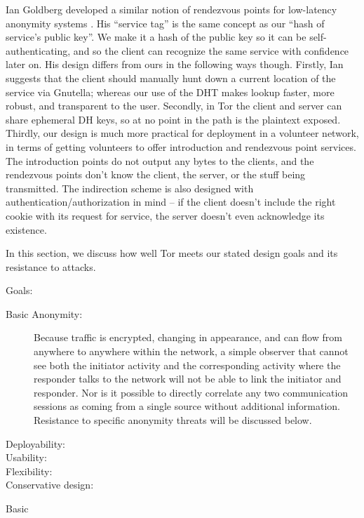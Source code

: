 \documentclass[times,10pt,twocolumn]{article}
\begin{document}
Ian Goldberg developed a similar notion of rendezvous points for
low-latency anonymity systems \cite{ian-thesis}. His ``service tag''
is the same concept as our ``hash of service's public key''. We make it
a hash of the public key so it can be self-authenticating, and so the
client can recognize the same service with confidence later on. His
design differs from ours in the following ways though. Firstly, Ian
suggests that the client should manually hunt down a current location of
the service via Gnutella; whereas our use of the DHT makes lookup faster,
more robust, and transparent to the user. Secondly, in Tor the client
and server can share ephemeral DH keys, so at no point in the path is
the plaintext
exposed. Thirdly, our design is much more practical for deployment in a
volunteer network, in terms of getting volunteers to offer introduction
and rendezvous point services. The introduction points do not output any
bytes to the clients, and the rendezvous points don't know the client,
the server, or the stuff being transmitted. The indirection scheme
is also designed with authentication/authorization in mind -- if the
client doesn't include the right cookie with its request for service,
the server doesn't even acknowledge its existence.

\label{sec:analysis}

In this section, we discuss how well Tor meets our stated design goals
and its resistance to attacks.

Goals:
\begin{description}
\item [Basic Anonymity:] Because traffic is encrypted, changing in
  appearance, and can flow from anywhere to anywhere within the
  network, a simple observer that cannot see both the initiator
  activity and the corresponding activity where the responder talks to
  the network will not be able to link the initiator and responder.
  Nor is it possible to directly correlate any two communication
  sessions as coming from a single source without additional
  information. Resistance to specific anonymity threats will be discussed
  below.

\item[Deployability:]

\item[Usability:] 
\item[Flexibility:] 
\item[Conservative design:] 
\end{description}
Basic 
\end{document}
